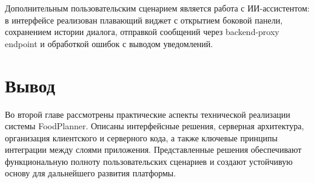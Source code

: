 Дополнительным пользовательским сценарием является работа с ИИ-ассистентом: в интерфейсе реализован плавающий виджет с открытием боковой панели, сохранением истории диалога, отправкой сообщений через backend-proxy endpoint и обработкой ошибок с выводом уведомлений.

\section{Вывод}

Во второй главе рассмотрены практические аспекты технической реализации системы FoodPlanner. Описаны интерфейсные решения, серверная архитектура, организация клиентского и серверного кода, а также ключевые принципы интеграции между слоями приложения. Представленные решения обеспечивают функциональную полноту пользовательских сценариев и создают устойчивую основу для дальнейшего развития платформы.